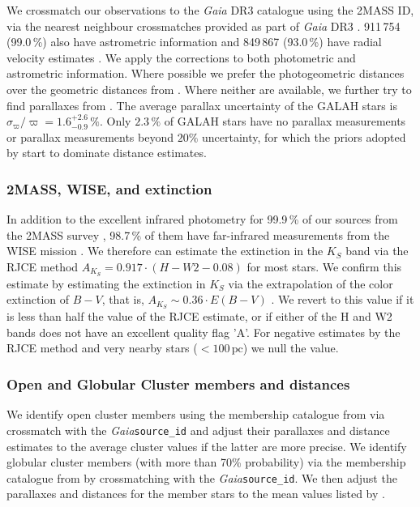 \documentclass[
  journal=pasa,
  manuscript=research-paper, %
  year=2023,
  volume=37
]{cup-journal}
\newcommand{\Gaia}{\textit{Gaia}\xspace}
\begin{document}
We crossmatch our observations to the \Gaia DR3 catalogue \citep{Brown2021,GaiaDR3} using the 2MASS ID, via the nearest neighbour crossmatches provided as part of \Gaia DR3 \citep{Torra2021}. 
911\,754 (99.0\,\%) also have astrometric information \citep{Lindegren2021a} and 849\,867 (93.0\,\%) have radial velocity estimates \citep{Katz2022}. We apply the corrections to both photometric \citep{Riello2021} and astrometric \citep{Lindegren2021b}information. Where possible we prefer the photogeometric distances over the geometric distances from \citep{BailerJones2021}. Where neither are available, we further try to find parallaxes from \cite{vanLeeuwen2007}. The average parallax uncertainty of the GALAH stars is $\sigma_{\varpi} / \varpi = 1.6_{-0.9}^{+2.6}\,\mathrm{\%}$. Only $2.3\,\%$ of GALAH stars have no parallax measurements or parallax measurements beyond $20\%$ uncertainty, for which the priors adopted by \citep{BailerJones2021} start to dominate distance estimates.

\subsubsection{2MASS, WISE, and extinction}

In addition to the excellent infrared photometry for 99.9\,\% of our sources from the 2MASS survey \citep{Skrutskie2006}, 98.7\,\% of them have far-infrared measurements from the WISE mission \citep{Cutri2013}. We therefore can estimate the extinction in the $K_S$ band via the RJCE method \citep{Majewski2011} $A_{K_S}  = 0.917 \cdot \left( H - W2 - 0.08 \right)$ for most stars. We confirm this estimate by estimating the extinction in $K_S$ via the extrapolation of the color extinction of $B-V$, that is, $A_{K_S} \sim 0.36 \cdot E(B-V)$ \citep{Cardelli1989}. We revert to this value if it is less than half the value of the RJCE estimate, or if either of the H and W2 bands does not have an excellent quality flag 'A'. For negative estimates by the RJCE method and very nearby stars ($<100\,\mathrm{pc}$) we null the value.

\subsubsection{Open and Globular Cluster members and distances} \label{sec:oc_gc}

We identify open cluster members using the membership catalogue from \citet{CantatGaudin2020} via crossmatch with the \Gaia \texttt{source\_id} and adjust their parallaxes and distance estimates to the average cluster values if the latter are more precise. We identify globular cluster members (with more than 70\% probability) via the membership catalogue from \citet{Vasiliev2021} by crossmatching with the \Gaia \texttt{source\_id}. We then adjust the parallaxes and distances for the member stars to the mean values listed by \citet{Baumgardt2021}.
\end{document}
